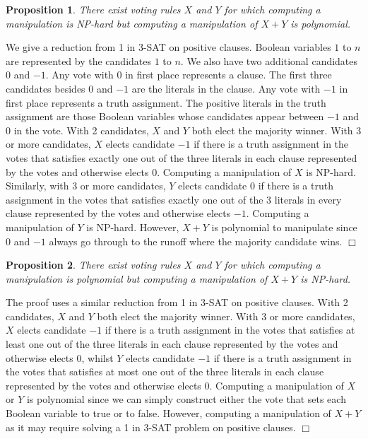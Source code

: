 \documentclass{ecai2012}
\newcommand{\winner}[2]{\mbox{$#1 + #2$}}
\newtheorem{proposition}{Proposition}
\newcommand{\myproof}{\vspace{-3mm}\noindent {\bf Proof:\ \ }}
\newcommand{\myqed}{\mbox{$\Box$}}
\begin{document}
\begin{proposition}
There exist voting rules $X$ and $Y$
for which computing a manipulation
is NP-hard but computing a manipulation
of $\winner{X}{Y}$
is polynomial.
\end{proposition}
\myproof
We give a reduction from 1 in 3-SAT on
positive clauses. Boolean variables
$1$ to $n$ are represented by the candidates
$1$ to $n$. We also have two additional
candidates $0$ and $-1$. Any vote
with $0$ in first place represents
a clause. The first three candidates besides
$0$ and $-1$ are the literals in the
clause. Any vote with $-1$ in first place
represents a truth assignment.
The positive literals in the truth
assignment are those Boolean variables
whose candidates appear
between $-1$ and $0$ in the vote.
With 2 candidates, $X$ and $Y$ both
elect the majority winner.
With 3 or more candidates,
$X$ elects
candidate $-1$ if there is a truth
assignment in the votes that satisfies
exactly one out of the three literals in
each clause represented by the votes
and otherwise elects $0$.
Computing a manipulation of $X$ %
is NP-hard.
Similarly, with 3 or more candidates,
$Y$ elects
candidate $0$ if there is a truth
assignment in the votes that satisfies
exactly one out of the 3 literals in
every clause represented by the votes
and otherwise elects $-1$.
Computing a manipulation of $Y$ %
is NP-hard. However,
$\winner{X}{Y}$ is polynomial to
manipulate since $0$ and $-1$ always
go through to the runoff where
the majority candidate wins.
\myqed

\begin{proposition}
There exist voting rules $X$ and $Y$
for which computing a manipulation
is polynomial but computing a manipulation
of $\winner{X}{Y}$ is NP-hard.
\end{proposition}
\myproof
The proof uses a similar reduction from 1 in 3-SAT on
positive clauses.
With 2 candidates, $X$ and $Y$ both
elect the majority winner.
With 3 or more candidates,
$X$ elects
candidate $-1$ if there is a truth
assignment in the votes that satisfies
at least one out of the three literals in
each clause represented by the votes
and otherwise elects $0$,
whilst $Y$ elects
candidate $-1$ if there is a truth
assignment in the votes that satisfies
at most one out of the three literals in
each clause represented by the votes
and otherwise elects $0$.
Computing a manipulation of $X$ or $Y$
is polynomial since we can simply construct
either the vote that %
sets each Boolean variable to true or to false.
However, computing a manipulation of $\winner{X}{Y}$
as it may require
solving a 1 in 3-SAT problem on positive
clauses.
\myqed
\end{document}
